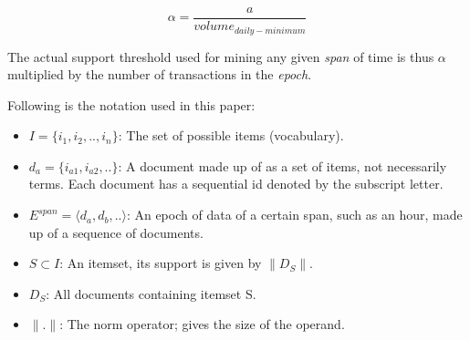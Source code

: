 \documentclass{sig-alternate}
\begin{document}
\begin{equation}\alpha = \frac{a}{volume_{daily-minimum}}\end{equation}

The actual support threshold used for mining any given \emph{span} of time is thus $\alpha$ multiplied by the number of transactions in the \emph{epoch}. 



Following is the notation used in this paper:

\begin{itemize}
\item $I = \{i_1,i_2,..,i_n\}$: The set of possible items (vocabulary).
\item $d_a = \{i_{a1},i_{a2},..\}$: A document made up of as a set of items, not necessarily terms. Each document has a sequential id denoted by the subscript letter.
\item $E^{span} = \langle d_a, d_b, ..\rangle$: An epoch of data of a certain span, such as an hour, made up of a sequence of documents.
\item $S \subset I$: An itemset, its support is given by $\|D_S\|$.
\item $D_S$: All documents containing itemset S.
\item $\|.\|$: The norm operator; gives the size of the operand.

\end{itemize}
\end{document}
